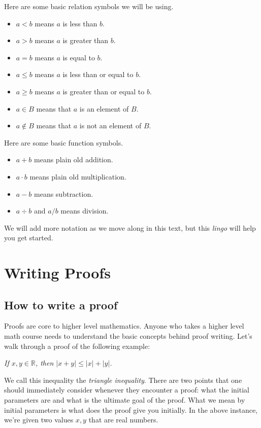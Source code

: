 \documentclass[12pt]{book}
\def\R{{\mathbb{R}}}
\begin{document}
Here are some basic relation symbols we will be using.

\begin{itemize}
\item $a<b$ means $a$ is less than $b$.
\item $a>b$ means $a$ is greater than $b$.
\item $a=b$ means $a$ is equal to $b$.
\item $a\leq b$ means $a$ is less than or equal to $b$.
\item $a\geq b$ means $a$ is greater than or equal to $b$.
\item $a\in B$ means that $a$ is an element of $B$.
\item $a\notin B$ means that $a$ is not an element of $B$.
\end{itemize}

Here are some basic function symbols.
\begin{itemize}
\item $a+b$ means plain old addition.
\item $a\cdot b$ means plain old multiplication.
\item $a-b$ means subtraction.
\item $a\div b$ and $a/b$ means division.
\end{itemize}

\noindent We will add more notation as we move along in this text, but this \textit{lingo} will help you get started.

\section{Writing Proofs}
\subsection*{How to write a proof}
	Proofs are core to higher level mathematics. Anyone who takes a higher level math course needs to understand the basic concepts behind proof writing. 
	Let's walk through a proof of the following example: 
	\begin{center}
	\textit{If $x,y\in\R$, then $|x+y|\leq |x|+|y|$.}
	\end{center}
We call this inequality the \textit{triangle inequality}. There are two points that one should immediately consider whenever they encounter a proof: what the initial parameters are and what is the ultimate goal of the proof. What we mean by initial parameters is what does the proof give you initially. In the above instance, we're given two values $x,y$ that are real numbers. 
\end{document}
